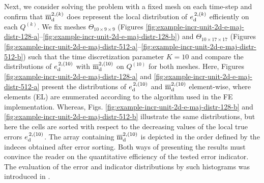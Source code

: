 \begin{example}
Next, we consider solving the problem with a fixed mesh on each time-step and 
confirm that $\overline{\mathrm m}^{2, ({k})}_{\mathrm{d}}$ does represent the local distribution of ${e}^{\,2, ({k})}_{\mathrm{d}}$ 
efficiently on each $Q^{(k)}$. We fix meshes $\Theta_{10 \times 9 \times 9}$ 
(Figures \ref{fig:example-incr-unit-2d-e-maj-distr-128-a}--\ref{fig:example-incr-unit-2d-e-maj-distr-128-b}) 
and $\Theta_{10 \times 17 \times 17}$ 
(Figures \ref{fig:example-incr-unit-2d-e-maj-distr-512-a}--\ref{fig:example-incr-unit-2d-e-maj-distr-512-b}) 
such that the time discretization parameter $K = 10$ and compare the distributions of ${e}^{\,2, ({10})}_{\mathrm{d}}$ 
with $\overline{\mathrm m}^{2, ({10})}_{\mathrm{d}}$ on $Q^{(10)}$ for both meshes. Here, Figures \ref{fig:example-incr-unit-2d-e-maj-distr-128-a} and 
\ref{fig:example-incr-unit-2d-e-maj-distr-512-a} present the distributions of 
${e}^{\,2, ({10})}_{\mathrm{d}}$ and 
$\overline{\mathrm m}^{2, ({10})}_{\mathrm{d}}$ element-wise, where elements (EL) are enumerated according to the algorithm 
used in the FE implementation. Whereas, Figs. 
\ref{fig:example-incr-unit-2d-e-maj-distr-128-b} and 
\ref{fig:example-incr-unit-2d-e-maj-distr-512-b} illustrate the same distributions, but 
here the cells are sorted with respect to the decreasing values of the local true errors 
${e}^{\,2, ({10})}_{\mathrm{d}}$. The array containing $\overline{\mathrm m}^{2, ({10})}_{\mathrm{d}}$ is depicted in the order defined by the
indeces obtained after error sorting. Both ways of presenting the results must convince the 
reader on the quantitative 
efficiency of the tested error indicator. The evaluation of the error and 
indicator distributions by such histograms was introduced in 
\cite[Section 3.4, Example 3.4]{Malietall2014}.


\end{example}
